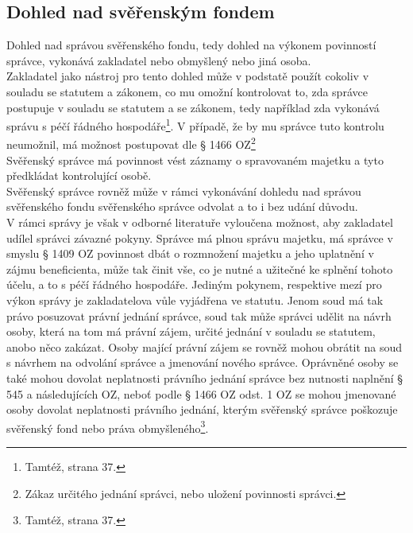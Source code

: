 \documentclass{article}
\begin{document}
\subsection{Dohled nad svěřenským fondem}

Dohled nad správou svěřenského fondu, tedy dohled na výkonem povinností správce, vykonává zakladatel nebo obmyšlený nebo jiná osoba.\\

Zakladatel jako nástroj pro tento dohled může v podstatě použít cokoliv v souladu se statutem a zákonem, co mu omožní kontrolovat to, zda správce postupuje v souladu se statutem a se zákonem, tedy například zda vykonává správu s péčí řádného hospodáře\footnote{Tamtéž, strana 37.}. V případě, že by mu správce tuto kontrolu neumožnil, má možnost postupovat dle § 1466 OZ\footnote{Zákaz určitého jednání správci, nebo uložení povinnosti správci.}\\

Svěřenský správce má povinnost vést záznamy o spravovaném majetku a tyto předkládat kontrolující osobě.\\

Svěřenský správce rovněž může v rámci vykonávání dohledu nad správou svěřenského fondu svěřenského správce odvolat a to i bez udání důvodu.\\

V rámci správy je však v odborné literatuře vyloučena možnost, aby zakladatel udílel správci závazné pokyny. Správce má plnou správu majetku, má správce v smyslu § 1409 OZ povinnost dbát o rozmnožení majetku a jeho uplatnění v zájmu beneficienta, může tak činit vše, co je nutné a užitečné ke splnění tohoto účelu, a to s péčí řádného hospodáře. Jediným pokynem, respektive mezí pro výkon správy je zakladatelova vůle vyjádřena ve statutu. Jenom soud má tak právo posuzovat právní jednání správce, soud tak může správci udělit na návrh osoby, která na tom má právní zájem, určité jednání v souladu se statutem, anobo něco zakázat. Osoby mající právní zájem se rovněž mohou obrátit na soud s návrhem na odvolání správce a jmenování nového správce. Oprávněné osoby se také mohou dovolat neplatnosti právního jednání správce bez nutnosti naplnění § 545 a následujících OZ, neboť podle § 1466 OZ odst. 1 OZ se mohou jmenované osoby dovolat neplatnosti právního jednání, kterým svěřenský správce poškozuje svěřenský fond nebo práva obmyšleného\footnote{Tamtéž, strana 37.}.\\
\end{document}
